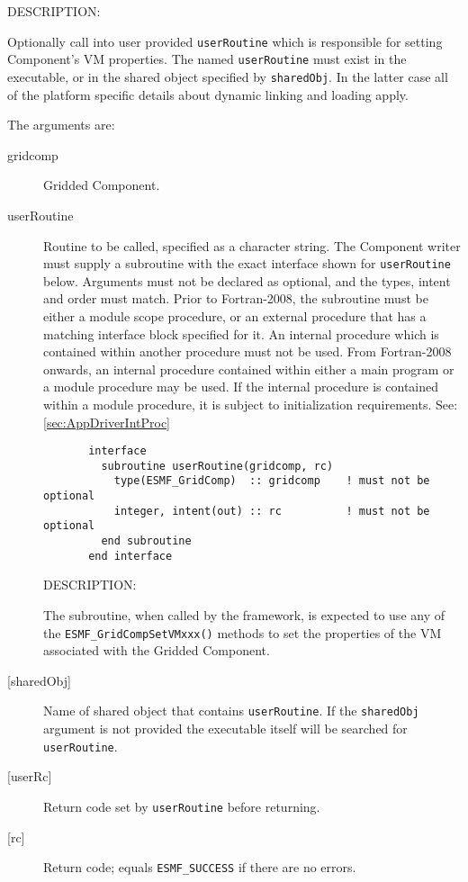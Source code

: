 {\sf DESCRIPTION:\\ }


   Optionally call into user provided {\tt userRoutine} which is responsible
   for setting Component's VM properties. The named
   {\tt userRoutine} must exist in the executable, or in the shared object
   specified by {\tt sharedObj}. In the latter case all of the platform
   specific details about dynamic linking and loading apply.
  
   The arguments are:
   \begin{description}
   \item[gridcomp]
     Gridded Component.
   \item[userRoutine]
     Routine to be called, specified as a character string.
     The Component writer must supply a subroutine with the exact interface
     shown for {\tt userRoutine} below. Arguments must not be declared
     as optional, and the types, intent and order must match.
     Prior to Fortran-2008, the subroutine must be either a module scope procedure,
     or an external procedure that has a matching interface block specified for it.
     An internal procedure which is contained within another procedure must not be used.
     From Fortran-2008 onwards, an internal procedure contained within either a main program
     or a module procedure may be used.  If the internal procedure is contained within a
     module procedure, it is subject to initialization requirements.  See: \ref{sec:AppDriverIntProc}
  
\begin{verbatim}       interface
         subroutine userRoutine(gridcomp, rc)
           type(ESMF_GridComp)  :: gridcomp    ! must not be optional
           integer, intent(out) :: rc          ! must not be optional
         end subroutine
       end interface\end{verbatim}
{\sf DESCRIPTION:\\ }


     The subroutine, when called by the framework, is expected to use any of the
     {\tt ESMF\_GridCompSetVMxxx()} methods to set the properties of the VM
     associated with the Gridded Component.
   \item[{[sharedObj]}]
     Name of shared object that contains {\tt userRoutine}. If the
     {\tt sharedObj} argument is not provided the executable itself will be
     searched for {\tt userRoutine}.
   \item[{[userRc]}]
     Return code set by {\tt userRoutine} before returning.
   \item[{[rc]}]
     Return code; equals {\tt ESMF\_SUCCESS} if there are no errors.
   \end{description}
   
